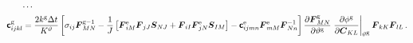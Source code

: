 \documentclass[10pt,letterpaper,oneside]{report}
\newcommand{\ten}[1]{\mbox{\boldmath $#1$}{}}
\newcommand{\tenf}[1]{\mbox{{\sffamily{\bfseries {#1}}}}}
\newcommand{\scas}[1]{\mbox{{\scriptsize{${\rm{#1}}$}}}{}}
\begin{document}
\begin{align}
\cdots{}& \notag \\
\tenf{c}^{\scas{g}}_{ijkl} 
={}& \frac{2 k^{\scas{g}} \Delta t}{K^\vartheta}  \left[ \sigma_{ij} \ten{F}^{\scas{g}-1}_{MN} - \frac{1}{J} \left[ \ten{F}^{\scas{e}}_{iM} \ten{F}_{jJ} \ten{S}_{NJ} + \ten{F}_{iI} \ten{F}^{\scas{e}}_{jN} \ten{S}_{IM} \right]
- \tenf{c}^{\scas{e}}_{ijmn} \ten{F}^{\scas{e}}_{mM} \ten{F}^{-1}_{Nn} \right] \frac{\partial \ten{F}^{\scas{g}}_{MN}}{\partial \vartheta^{\scas{g}}} \left. \frac{\partial \phi^{\scas{g}} }{\partial \ten{C}_{KL}} \right|_{\vartheta^{\scas{g}}} \ten{F}_{kK} \ten{F}_{lL} \, . 
\end{align}
\end{document}
